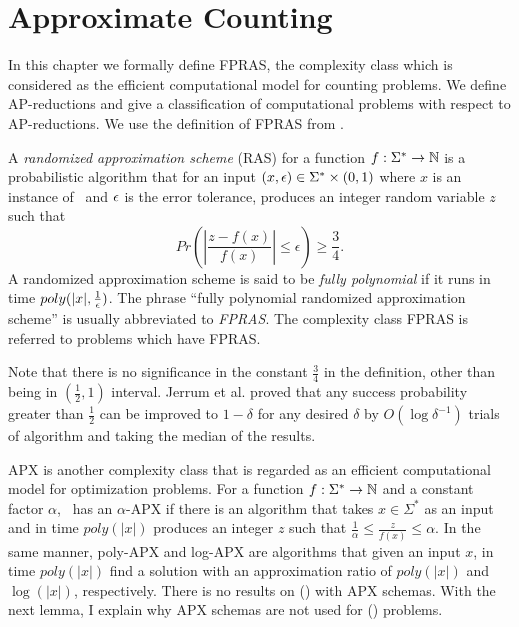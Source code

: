 \chapter{Approximate Counting} \label{chp:approx}
In this chapter we formally define FPRAS, the complexity class which
is considered as the efficient computational model for counting problems.
We define AP-reductions and give a classification of computational problems 
with respect to AP-reductions. We use the definition of FPRAS from \cite{counting}\@. 

A \emph{randomized approximation scheme} (RAS) for a function \(f:\Sigma^*\to\mathbb{N}\)
is a probabilistic algorithm that for an input \((x,\epsilon)\in\Sigma^*\times(0,1)\) 
where \(x\) is an instance of \mf\ and \(\epsilon\) is the error tolerance, 
produces an integer random variable \(z\) such that 
\[Pr\left(\left|\frac{z-f(x)}{f(x)}\right|\le \epsilon\right) \ge \frac{3}{4}.\]
A randomized approximation scheme is said to be \emph{fully polynomial} if it runs in time \(poly(|x|,\frac{1}{\epsilon})\)\@. 
The phrase ``fully polynomial randomized approximation scheme'' is usually abbreviated to 
\emph{FPRAS}\@. The complexity class FPRAS is referred to problems which have FPRAS\@.

Note that there is no significance in the constant \(\frac{3}{4}\) in the definition,
other than being in \((\frac{1}{2},1)\) interval. 
Jerrum et al. \cite{JVV} proved that any success probability 
greater than \(\frac{1}{2}\) can be improved to \(1-\delta\) for any desired \(\delta\) by
\(O(\log \delta^{-1})\) trials of algorithm and taking the median of the results.

APX is another complexity class that is regarded as an efficient computational model for
optimization problems.
For a function \(f:\Sigma^*\to\mathbb{N}\) and a constant factor \(\alpha\),
\mf\ has an \(\alpha\)-APX if there is an algorithm that
takes \(x\in\Sigma^*\) as an input and in time \(poly(|x|)\) produces an integer \(z\)
such that \(\frac{1}{\alpha}\le\frac{z}{f(x)}\le \alpha\). In the same manner,
poly-APX and log-APX are algorithms that given an input
\(x\), in time \(poly(|x|)\) find a solution with an approximation ratio of \(poly(|x|)\)
and \(\log(|x|)\), respectively. There is no results on \ccsp(\mrelset) with
APX schemas. With the next lemma, I explain why APX schemas are not used for \ccsp(\mrelset) problems.


